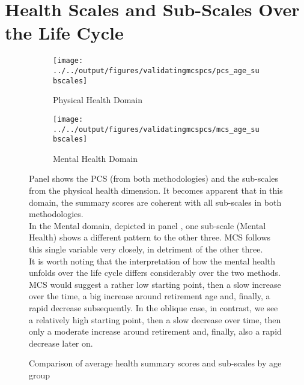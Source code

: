 \newpage

\section{Health Scales and Sub-Scales Over the Life Cycle}

\begin{figure}[h]
    \begin{subfigure}{0.45\textwidth}
        \centering
        \caption{Physical Health Domain}
        \texttt{[image: ../../output/figures/validatingmcspcs/pcs\_age\_subscales]}
        \label{fig:pcsagesubscales}
    \end{subfigure}
    \begin{subfigure}{0.45\textwidth}
        \centering
        \caption{Mental Health Domain}
        \texttt{[image: ../../output/figures/validatingmcspcs/mcs\_age\_subscales]}
        \label{fig:mcsagesubscales}
    \end{subfigure}
    \caption{Comparison of average health summary scores and sub-scales by age group}\label{fig:bothagesubscales}
        { \small \vspace*{6pt}
        Panel  shows the PCS (from both methodologies) and the sub-scales from the physical health dimension. 
        It becomes apparent that in this domain, the summary scores are coherent with all sub-scales in both methodologies. 
        \\ In the Mental domain, depicted in panel , one sub-scale (Mental Health) shows a different pattern to the other three. 
        MCS follows this single variable very closely, in detriment of the other three. 
        \\ It is worth noting that the interpretation of how the mental health unfolds over the life cycle differs considerably over the two methods. 
        MCS would suggest a rather low starting point, then a slow increase over the time, a big increase around retirement age and, finally, a rapid decrease subsequently. 
        In the oblique case, in contrast, we see a relatively high starting point, then a slow decrease over time, then only a moderate increase around retirement and, finally, also a rapid decrease later on. 
    }
\end{figure}



